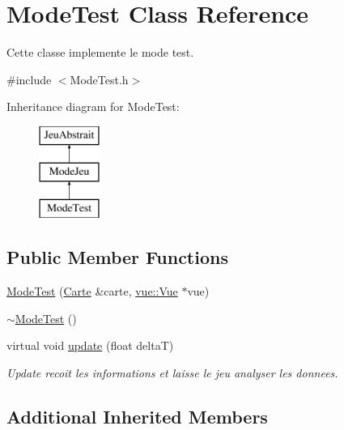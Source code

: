 \hypertarget{class_mode_test}{\section{Mode\-Test Class Reference}
\label{class_mode_test}
}


Cette classe implemente le mode test.  




{\ttfamily \#include $<$Mode\-Test.\-h$>$}

Inheritance diagram for Mode\-Test\-:\begin{figure}[H]
\begin{center}
\leavevmode
\includegraphics[height=3.000000cm]{class_mode_test}
\end{center}
\end{figure}
\subsection*{Public Member Functions}
\begin{DoxyCompactItemize}
\item 
\hyperlink{group__inf2990_ga9fd4b22227a767396e1d1697c34bb59e}{Mode\-Test} (\hyperlink{class_carte}{Carte} \&carte, \hyperlink{classvue_1_1_vue}{vue\-::\-Vue} $\ast$vue)
\item 
\hyperlink{group__inf2990_ga11f99d8a7a9a8bb928506ed416f6f280}{$\sim$\-Mode\-Test} ()
\item 
\hypertarget{group__inf2990_gae0bec82d1b43d696e9feaff9f321f7fe}{virtual void \hyperlink{group__inf2990_gae0bec82d1b43d696e9feaff9f321f7fe}{update} (float delta\-T)}\label{group__inf2990_gae0bec82d1b43d696e9feaff9f321f7fe}

\begin{DoxyCompactList}\small\item\em Update recoit les informations et laisse le jeu analyser les donnees. \end{DoxyCompactList}\end{DoxyCompactItemize}
\subsection*{Additional Inherited Members}


